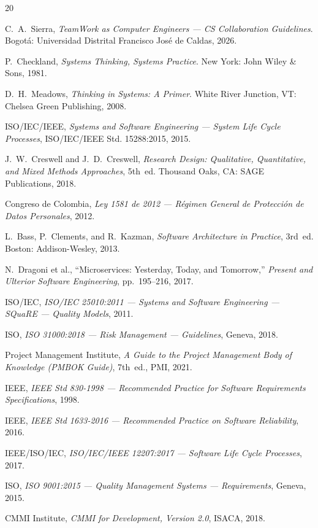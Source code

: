 \documentclass[11pt,a4paper]{article}
\begin{document}
\newpage
\begin{thebibliography}{20}

C.~A.~Sierra, \textit{TeamWork as Computer Engineers --- CS Collaboration Guidelines}. Bogot\'a: Universidad Distrital Francisco Jos\'e de Caldas, 2026.

P.~Checkland, \textit{Systems Thinking, Systems Practice}. New York: John Wiley \& Sons, 1981.

D.~H.~Meadows, \textit{Thinking in Systems: A Primer}. White River Junction, VT: Chelsea Green Publishing, 2008.

ISO/IEC/IEEE, \textit{Systems and Software Engineering --- System Life Cycle Processes}, ISO/IEC/IEEE Std. 15288:2015, 2015.

J.~W.~Creswell and J.~D.~Creswell, \textit{Research Design: Qualitative, Quantitative, and Mixed Methods Approaches}, 5th~ed. Thousand Oaks, CA: SAGE Publications, 2018.

Congreso de Colombia, \textit{Ley 1581 de 2012 --- R\'egimen General de Protecci\'on de Datos Personales}, 2012.

L.~Bass, P.~Clements, and R.~Kazman, \textit{Software Architecture in Practice}, 3rd~ed. Boston: Addison-Wesley, 2013.

N.~Dragoni et al., ``Microservices: Yesterday, Today, and Tomorrow,'' \textit{Present and Ulterior Software Engineering}, pp.~195--216, 2017.

ISO/IEC, \textit{ISO/IEC 25010:2011 --- Systems and Software Engineering --- SQuaRE --- Quality Models}, 2011.

ISO, \textit{ISO 31000:2018 --- Risk Management --- Guidelines}, Geneva, 2018.

Project Management Institute, \textit{A Guide to the Project Management Body of Knowledge (PMBOK Guide)}, 7th~ed., PMI, 2021.

IEEE, \textit{IEEE Std 830-1998 --- Recommended Practice for Software Requirements Specifications}, 1998.

IEEE, \textit{IEEE Std 1633-2016 --- Recommended Practice on Software Reliability}, 2016.

IEEE/ISO/IEC, \textit{ISO/IEC/IEEE 12207:2017 --- Software Life Cycle Processes}, 2017.

ISO, \textit{ISO 9001:2015 --- Quality Management Systems --- Requirements}, Geneva, 2015.

CMMI Institute, \textit{CMMI for Development, Version 2.0}, ISACA, 2018.

\end{thebibliography}
\end{document}
